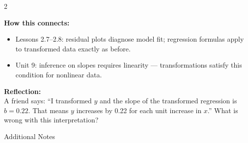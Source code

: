 \documentclass[10pt]{article}
\begin{document}
\vspace{0.1in}

\begin{spiralbox}
\small
\begin{multicols}{2}

\textbf{How this connects:}
\begin{itemize}[itemsep=3pt]
  \item Lessons 2.7--2.8: residual plots diagnose model fit; regression formulas apply
        to transformed data exactly as before.
  \item Unit 9: inference on slopes requires linearity --- transformations satisfy this
        condition for nonlinear data.
\end{itemize}

\columnbreak

\textbf{Reflection:}\\
A friend says: ``I transformed $y$ and the slope of the transformed regression is $b = 0.22$.
That means $y$ increases by 0.22 for each unit increase in $x$.'' What is wrong with this
interpretation?\\[2pt]

\end{multicols}
\end{spiralbox}

\vspace{0.1in}

\begin{notesbox}{Additional Notes}
\vspace{0pt}
\writeline\\\writeline\\\writeline\\\writeline\\\writeline\\\writeline
\end{notesbox}
\end{document}
